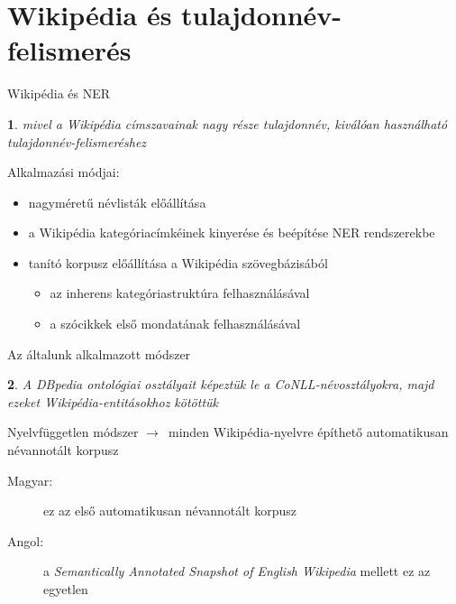 \documentclass[utf8x,t]{beamer}
\newcommand{\nyil}{$\rightarrow$\ }
\newtheorem{nix}{}[section]
\begin{document}
\section{Wikipédia és tulajdonnév-felismerés}

\begin{frame}{Wikipédia és NER}

\bigskip

\begin{nix}
mivel a Wikipédia címszavainak nagy része tulajdonnév, kiválóan használható tulajdonnév-felismeréshez
\end{nix}

\bigskip

Alkalmazási módjai:
\smallskip
\begin{itemize}
\item nagyméretű névlisták előállítása 
\item a Wikipédia kategóriacímkéinek kinyerése és beépítése NER rendszerekbe
\item tanító korpusz előállítása a Wikipédia szövegbázisából
\begin{itemize}
\item az inherens kategóriastruktúra felhasználásával
\item a szócikkek első mondatának felhasználásával
\end{itemize} 
\end{itemize}

\end{frame}

\begin{frame}{Az általunk alkalmazott módszer}

\begin{nix}
A DBpedia ontológiai osztályait képeztük le a CoNLL-névosztályokra, majd ezeket Wikipédia-entitásokhoz kötöttük
\end{nix}

\bigskip

Nyelvfüggetlen módszer \nyil minden Wikipédia-nyelvre építhető automatikusan névannotált korpusz

\bigskip

\begin{description}
\item[Magyar:] ez az első automatikusan névannotált korpusz
\item[Angol:] a \textit{Semantically Annotated Snapshot of English Wikipedia} mellett ez az egyetlen
\end{description}

\end{frame}
\end{document}
